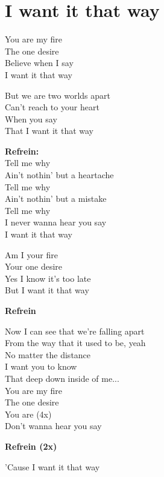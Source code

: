 \section{I want it that way}
You are my fire\\
The one desire\\
Believe when I say\\
I want it that way

But we are two worlds apart\\
Can’t reach to your heart\\
When you say\\
That I want it that way

\textbf{Refrein:}\\
Tell me why\\
Ain’t nothin’ but a heartache\\
Tell me why\\
Ain’t nothin’ but a mistake\\
Tell me why\\
I never wanna hear you say\\
I want it that way

Am I your fire\\
Your one desire\\
Yes I know it’s too late\\
But I want it that way

\textbf{Refrein}

Now I can see that we’re falling apart\\
From the way that it used to be, yeah\\
No matter the distance\\
I want you to know\\
That deep down inside of me...\\
You are my fire\\
The one desire\\
You are (4x)\\
Don’t wanna hear you say

\textbf{Refrein (2x)}

’Cause I want it that way
